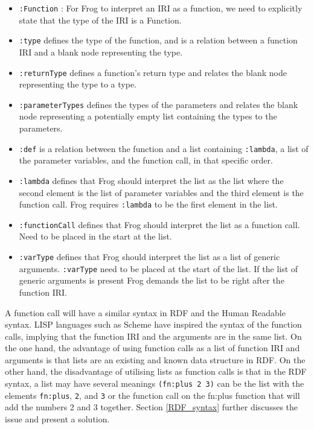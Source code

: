 \begin{itemize}
    \item \lstinline{:Function} : For Frog to interpret an IRI as a function, we need to explicitly state that the type of the IRI is a Function. 
    \item \lstinline{:type} defines the type of the function, and is a relation between a function IRI and a blank node representing the type.
    \item \lstinline{:returnType} defines a function's return type and relates the blank node representing the type to a type. 
    \item \lstinline{:parameterTypes} defines the types of the parameters and relates the blank node representing a potentially empty list containing the types to the parameters.
    \item \lstinline{:def} is a relation between the function and a list containing \lstinline{:lambda}, a list of the parameter variables, and the function call, in that specific order. 
    \item \lstinline{:lambda} defines that Frog should interpret the list as the list where the second element is the list of parameter variables and the third element is the function call. Frog requires \lstinline{:lambda} to be the first element in the list. 
    \item \lstinline{:functionCall} defines that Frog should interpret the list as a function call. Need to be placed in the start at the list. 
    \item \lstinline{:varType} defines that Frog should interpret the list as a list of generic arguments. \lstinline{:varType} need to be placed at the start of the list. If the list of generic arguments is present Frog demands the list to be right after the function IRI. 
  
\end{itemize}

\para 
A function call will have a similar syntax in RDF and the Human Readable syntax. LISP languages such as Scheme have inspired the syntax of the function calls, implying that the function IRI and the arguments are in the same list. On the one hand, the advantage of using function calls as a list of function IRI and arguments is that lists are an existing and known data structure in RDF. On the other hand, the disadvantage of utilising lists as function calls is that in the RDF syntax, a list may have several meanings \lstinline{(fn:plus 2 3)} can be the list with the elements \lstinline{fn:plus}, \lstinline{2}, and \lstinline{3} or the function call on the fn:plus function that will add the numbers 2 and 3 together. Section \ref{RDF_syntax} further discusses the issue and present a solution.

